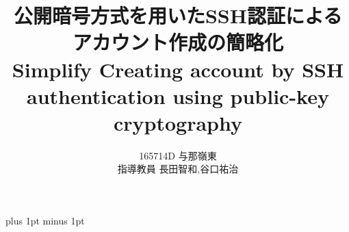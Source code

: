 \documentclass[a4j,12pt]{jreport}
\title{
公開暗号方式を用いたSSH認証によるアカウント作成の簡略化\\
Simplify Creating account by %
SSH authentication using public-key cryptography
}
\author{165714D 与那嶺東  \\ 指導教員 {長田智和,谷口祐治} }
\begin{document}
\maketitle
\baselineskip 17pt plus 1pt minus 1pt

\setcounter{page}{0}

\tableofcontents	%
\listoffigures		%
\listoftables		%








%







%
\end{document}

